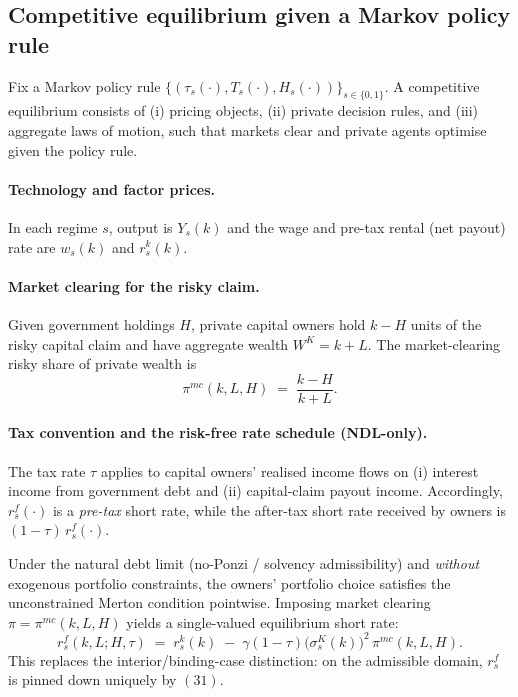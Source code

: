 \documentclass{article}
\begin{document}

\subsection{Competitive equilibrium given a Markov policy rule}

Fix a Markov policy rule $\{(\tau_s(\cdot),T_s(\cdot),H_s(\cdot))\}_{s\in\{0,1\}}$. A competitive equilibrium consists of (i) pricing objects, (ii) private decision rules, and (iii) aggregate laws of motion, such that markets clear and private agents optimise given the policy rule.

\paragraph{Technology and factor prices.}
In each regime $s$, output is $Y_s(k)$ and the wage and pre-tax rental (net payout) rate are $w_s(k)$ and $r^k_s(k)$.

\paragraph{Market clearing for the risky claim.}
Given government holdings $H$, private capital owners hold $k-H$ units of the risky capital claim and have aggregate wealth $W^K = k+L$. The market-clearing risky share of private wealth is
\begin{equation}
\pi^{mc}(k,L,H) \;=\; \frac{k-H}{k+L}.
\tag{30}
\end{equation}

\paragraph{Tax convention and the risk-free rate schedule (NDL-only).}
The tax rate $\tau$ applies to capital owners' realised income flows on (i) interest income from government debt and (ii) capital-claim payout income. Accordingly, $r^f_s(\cdot)$ is a \emph{pre-tax} short rate, while the after-tax short rate received by owners is $(1-\tau)\,r^f_s(\cdot)$.

Under the natural debt limit (no-Ponzi / solvency admissibility) and \emph{without} exogenous portfolio constraints, the owners' portfolio choice satisfies the unconstrained Merton condition pointwise. Imposing market clearing $\pi=\pi^{mc}(k,L,H)$ yields a single-valued equilibrium short rate:
\begin{equation}
r^f_s(k,L;H,\tau)
\;=\;
r^k_s(k) \;-\; \gamma(1-\tau)\big(\sigma^K_s(k)\big)^2\,\pi^{mc}(k,L,H).
\tag{31}
\end{equation}
This replaces the interior/binding-case distinction: on the admissible domain, $r^f_s$ is pinned down uniquely by \((31)\).
\end{document}

